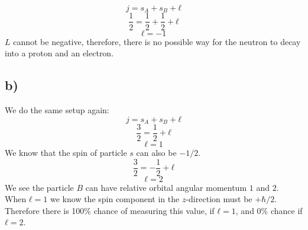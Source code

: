 \documentclass{article}
\begin{document}
\[
j = s_A + s_B + ℓ
\]
\[
\frac{1}{2} = \frac{1}{2} + \frac{1}{2} + ℓ
\]
\[
ℓ = -1
\]
$L$ cannot be negative, therefore, there is no possible way for the neutron to decay into a proton and an electron. 

\subsection*{b)}
We do the same setup again:
\[
j = s_A + s_B + ℓ
\]
\[
\frac{3}{2} = \frac{1}{2} + ℓ
\]
\[
ℓ = 1
\]
We know that the spin of particle $s$ can also be $- 1 / 2$. 
\[
\frac{3}{2} = -\frac{1}{2} + ℓ
\]
\[
ℓ = 2
\]
We see the particle $B$ can have relative orbital angular momentum $1$ and $2$. When $ℓ = 1$ we know the spin component in the $z$-direction must be $+ℏ / 2$. Therefore there is 100\% chance of measuring this value, if $ℓ = 1$, and 0\% chance if $ℓ = 2$.  
\end{document}
